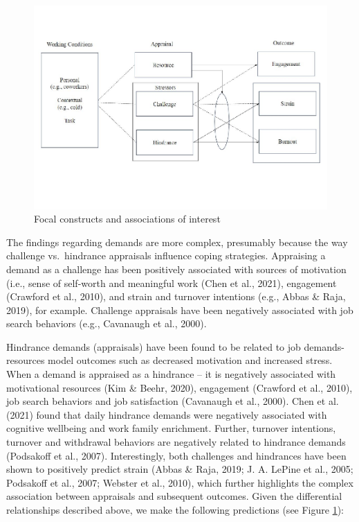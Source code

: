 \documentclass[
  man]{apa7}
\begin{document}
\begin{figure}
\centering
\includegraphics{Submission_files/figure-latex/ourmodel-1.pdf}
\caption{\label{fig:ourmodel}Focal constructs and associations of interest}
\end{figure}

The findings regarding demands are more complex, presumably because the way challenge vs.~hindrance appraisals influence coping strategies. Appraising a demand as a challenge has been positively associated with sources of motivation (i.e., sense of self-worth and meaningful work (Chen et al., 2021), engagement (Crawford et al., 2010), and strain and turnover intentions (e.g., Abbas \& Raja, 2019), for example. Challenge appraisals have been negatively associated with job search behaviors (e.g., Cavanaugh et al., 2000).

Hindrance demands (appraisals) have been found to be related to job demands-resources model outcomes such as decreased motivation and increased stress. When a demand is appraised as a hindrance -- it is negatively associated with motivational resources (Kim \& Beehr, 2020), engagement (Crawford et al., 2010), job search behaviors and job satisfaction (Cavanaugh et al., 2000). Chen et al. (2021) found that daily hindrance demands were negatively associated with cognitive wellbeing and work family enrichment. Further, turnover intentions, turnover and withdrawal behaviors are negatively related to hindrance demands (Podsakoff et al., 2007). Interestingly, both challenges and hindrances have been shown to positively predict strain (Abbas \& Raja, 2019; J. A. LePine et al., 2005; Podsakoff et al., 2007; Webster et al., 2010), which further highlights the complex association between appraisals and subsequent outcomes. Given the differential relationships described above, we make the following predictions (see Figure \ref{fig:ourmodel}):
\end{document}
